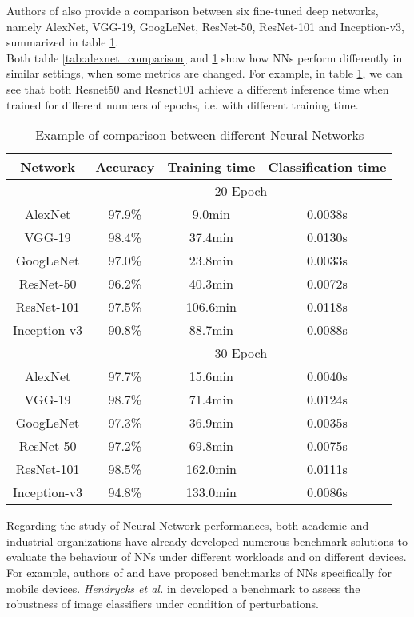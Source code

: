 Authors of \cite{suh_transfer_2018} also provide a comparison between six fine-tuned deep networks, namely AlexNet, VGG-19, GoogLeNet, ResNet-50, ResNet-101 and Inception-v3, summarized in table \ref{tab:models_ex_comp}.\\
Both table \ref{tab:alexnet_comparison} and \ref{tab:models_ex_comp} show how NNs perform differently in similar settings, when some metrics are changed. For example, in table \ref{tab:models_ex_comp}, we can see that both Resnet50 and Resnet101 achieve a different inference time when trained for different numbers of epochs, i.e. with different training time.\\
\begin{table}[h]
\centering
\begin{tabular}{|c| ccc|}
  \hline
 Network &Accuracy& Training time   &Classification time   \\
 \hline
 &\multicolumn{3}{c|}{20 Epoch}\\
 \hline
AlexNet &97.9\%& 9.0min   &0.0038s    \\
VGG-19 &98.4\%& 37.4min   &0.0130s  \\
GoogLeNet &97.0\%& 23.8min  &0.0033s \\
ResNet-50 &96.2\%& 40.3min  &0.0072s\\
ResNet-101 &97.5\%& 106.6min   &0.0118s \\
Inception-v3 &90.8\%& 88.7min &0.0088s \\
\hline
&\multicolumn{3}{c|}{30 Epoch}\\
\hline
AlexNet & 97.7\% &15.6min &0.0040s     \\
VGG-19 &98.7\% &71.4min&0.0124s  \\
GoogLeNet  &97.3\% &36.9min& 0.0035s     \\
ResNet-50 & 97.2\% &69.8min&0.0075s      \\
ResNet-101 & 98.5\% &162.0min&   0.0111s   \\
Inception-v3 & 94.8\% &133.0min   & 0.0086s  \\
\hline
\end{tabular}
\caption[Example of comparison between different Neural Networks]{Example of comparison between different Neural Networks \cite{suh_transfer_2018}}
 \label{tab:models_ex_comp}
\end{table}
Regarding the study of Neural Network performances, both academic and industrial organizations have already developed numerous benchmark solutions to evaluate the behaviour of NNs under different workloads and on different devices. For example, authors of \cite{luo2020comparison} and \cite{ignatov2019ai} have proposed benchmarks of NNs specifically for mobile devices. \textit{Hendrycks et al.} in  \cite{hendrycks2019benchmarking} developed a benchmark to assess the robustness of image classifiers under condition of perturbations. \\
